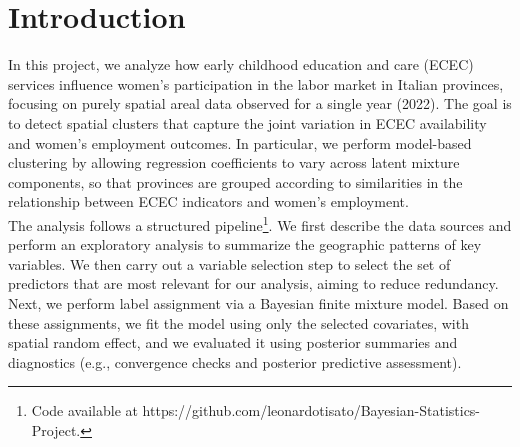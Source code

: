 \section{Introduction}
\label{sec:introduction}
\noindent In this project, we analyze how early childhood education and care (ECEC) services influence women's participation in the labor market in Italian provinces, focusing on purely spatial areal data observed for a single year (2022). 
The goal is to detect spatial clusters that capture the joint variation in ECEC availability and women's employment outcomes. In particular, we perform model-based clustering by allowing regression coefficients to vary across latent mixture components, so that provinces are grouped according to similarities in the relationship between ECEC indicators and women's employment.\\

\noindent The analysis follows a structured pipeline\footnote{Code available at https://github.com/leonardotisato/Bayesian-Statistics-Project.}. We first describe the data sources and perform an exploratory analysis to summarize the geographic patterns of key variables. We then carry out a variable selection step to select the set of predictors that are most relevant for our analysis, aiming to reduce redundancy. Next, we perform label assignment via a Bayesian finite mixture model. Based on these assignments, we fit the model using only the selected covariates, with spatial random effect, and we evaluated it using posterior summaries and diagnostics (e.g., convergence checks and posterior predictive assessment).